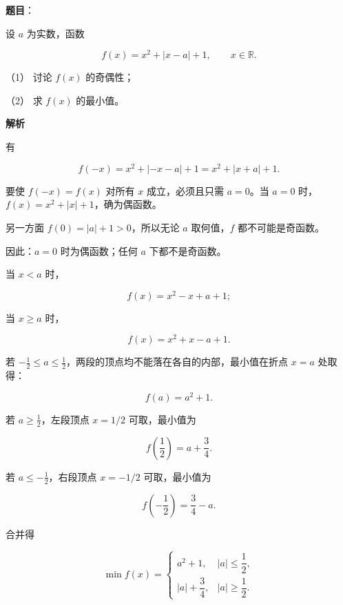 \begin{answer}

\textbf{题目}：

设 $a$ 为实数，函数

\nopagebreak[4]
\[
f(x)=x^2+|x-a|+1,\qquad x\in\mathbb R.
\]

（1） 讨论 $f(x)$ 的奇偶性；

（2） 求 $f(x)$ 的最小值。

\textbf{解析}


有

\nopagebreak[4]
\[
f(-x)=x^2+|-x-a|+1=x^2+|x+a|+1.
\]

要使 $f(-x)=f(x)$ 对所有 $x$ 成立，必须且只需 $a=0$。当 $a=0$ 时，$f(x)=x^2+|x|+1$，确为偶函数。

另一方面 $f(0)=|a|+1>0$，所以无论 $a$ 取何值，$f$ 都不可能是奇函数。

因此：$a=0$ 时为偶函数；任何 $a$ 下都不是奇函数。


当 $x<a$ 时，

\nopagebreak[4]
\[
f(x)=x^2-x+a+1;
\]

当 $x\geqslant a$ 时，

\nopagebreak[4]
\[
f(x)=x^2+x-a+1.
\]

若 $-\frac12\leqslant a\leqslant\frac12$，两段的顶点均不能落在各自的内部，最小值在折点 $x=a$ 处取得：

\nopagebreak[4]
\[
f(a)=a^2+1.
\]

若 $a\geqslant\frac12$，左段顶点 $x=1/2$ 可取，最小值为

\nopagebreak[4]
\[
f\left(\frac12\right)=a+\frac34.
\]

若 $a\leqslant-\frac12$，右段顶点 $x=-1/2$ 可取，最小值为

\nopagebreak[4]
\[
f\left(-\frac12\right)=\frac34-a.
\]

合并得

\nopagebreak[4]
\[
\min f(x)=
\begin{cases}
a^2+1,& |a|\leqslant\dfrac12,\\[4pt]
|a|+\dfrac34,& |a|\geqslant\dfrac12.
\end{cases}
\]



\end{answer}
